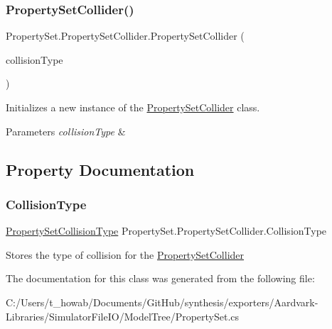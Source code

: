 \subsubsection{\texorpdfstring{Property\+Set\+Collider()}{PropertySetCollider()}}
{\footnotesize\ttfamily Property\+Set.\+Property\+Set\+Collider.\+Property\+Set\+Collider (\begin{DoxyParamCaption}\item[{\hyperlink{class_property_set_1_1_property_set_collider_a6c640ed4b9ab14dffc7da13b1e4bf51e}{Property\+Set\+Collision\+Type}}]{collision\+Type }\end{DoxyParamCaption})}



Initializes a new instance of the \hyperlink{class_property_set_1_1_property_set_collider}{Property\+Set\+Collider} class. 


\begin{DoxyParams}{Parameters}
{\em collision\+Type} & \\
\hline
\end{DoxyParams}


\subsection{Property Documentation}
\mbox{\label{class_property_set_1_1_property_set_collider_a68838b774adc4d08f1b07c819263f90b}} 
\subsubsection{\texorpdfstring{Collision\+Type}{CollisionType}}
{\footnotesize\ttfamily \hyperlink{class_property_set_1_1_property_set_collider_a6c640ed4b9ab14dffc7da13b1e4bf51e}{Property\+Set\+Collision\+Type} Property\+Set.\+Property\+Set\+Collider.\+Collision\+Type\hspace{0.3cm}{\ttfamily [get]}}



Stores the type of collision for the \hyperlink{class_property_set_1_1_property_set_collider}{Property\+Set\+Collider} 



The documentation for this class was generated from the following file\+:\begin{DoxyCompactItemize}
\item 
C\+:/\+Users/t\+\_\+howab/\+Documents/\+Git\+Hub/synthesis/exporters/\+Aardvark-\/\+Libraries/\+Simulator\+File\+I\+O/\+Model\+Tree/Property\+Set.\+cs\end{DoxyCompactItemize}

